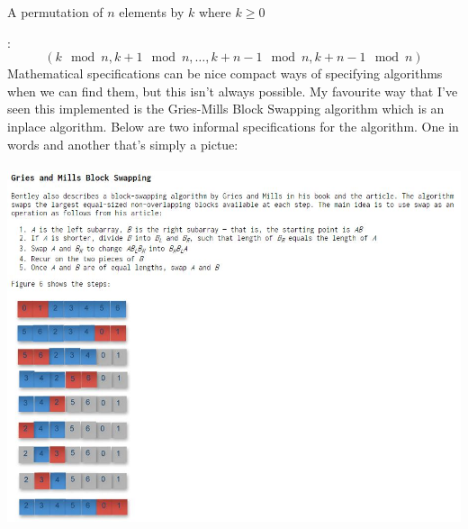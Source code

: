 \documentclass[12pt]{article}
\begin{document}
\centerline{A permutation of $n$ elements by $k$ where $k\geq 0$}:
$$(k\mod{n},k+1\mod{n},\dots,k+n-1\mod{n},k+n-1\mod{n})$$
Mathematical specifications can be nice compact ways of specifying algorithms when we can find them, but this isn't always possible. My favourite way that I've seen this implemented is the Gries-Mills Block Swapping algorithm which is an inplace algorithm. Below are two informal specifications for the algorithm. One in words and another that's simply a pictue:\\\\
\noindent \includegraphics[scale = 0.62]{griesmills.jpg}
\newpage
\end{document}
